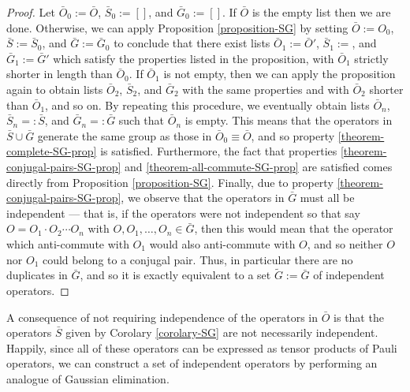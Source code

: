 \documentclass[twocolumn,showpacs,preprintnumbers,amsmath,amssymb,nofootinbib,pra,floatfix]{revtex4}
\newenvironment{remark}[1][Remark]{\begin{trivlist}
\item[\hskip \labelsep {\bfseries #1}]}{\end{trivlist}}
\begin{document}
\begin{proof}
Let $\bar O_0:=\bar O$, $\bar S_0:=[]$, and $\bar G_0:=[]$.  If $\bar O$ is the empty list then we are done.  Otherwise, we can apply Proposition \ref{proposition-SG} by setting $\bar O := O_0$, $\bar S:=\bar S_0$, and $\bar G := \bar G_0$ to conclude that there exist lists $\bar O_1:=\bar O'$, $\bar S_1:=$, and $\bar G_1:=\bar G'$ which satisfy the properties listed in the proposition, with $\bar O_1$ strictly shorter in length than $\bar O_0$.  If $\bar O_1$ is not empty, then we can apply the proposition again to obtain lists $\bar O_2$, $\bar S_2$, and $\bar G_2$ with the same properties and with $\bar O_2$ shorter than $\bar O_1$, and so on.  By repeating this procedure, we eventually obtain lists $\bar O_n$, $\bar S_n=:\bar S$, and $\bar G_n=:\bar G$ such that $\bar O_n$ is empty.  This means that the operators in $\bar S \cup \bar G$ generate the same group as those in $\bar O_0\equiv \bar O$, and so property \ref{theorem-complete-SG-prop} is satisfied.  Furthermore, the fact that properties \ref{theorem-conjugal-pairs-SG-prop} and \ref{theorem-all-commute-SG-prop} are satisfied comes directly from Proposition \ref{proposition-SG}.  Finally, due to property \ref{theorem-conjugal-pairs-SG-prop}, we observe that the operators in $\bar G$ must all be independent --- that is, if the operators were not independent so that say $O=O_1\cdot O_2\cdots O_n$ with $O,O_1,\dots,O_n\in\bar G$, then this would mean that the operator which anti-commute with $O_1$ would also anti-commute with $O$, and so neither $O$ nor $O_1$ could belong to a conjugal pair.  Thus, in particular there are no duplicates in $\bar G$, and so it is exactly equivalent to a set $\tilde G:=\bar G$ of independent operators.
\end{proof}
\begin{remark}
A consequence of not requiring independence of the operators in $\bar O$ is that the operators $\bar S$ given by Corolary \ref{corolary-SG} are not necessarily independent.  Happily, since all of these operators can be expressed as tensor products of Pauli operators, we can construct a set of independent operators by performing an analogue of Gaussian elimination.
\end{remark}
\end{document}
